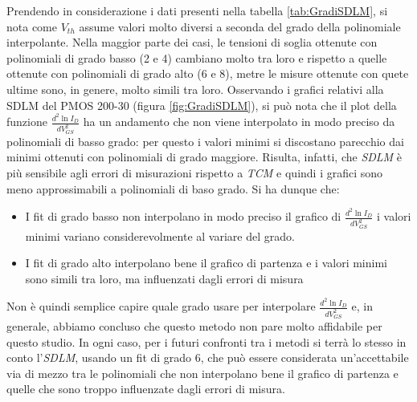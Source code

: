 \documentclass[12pt, letterpaper]{book}
\begin{document}
Prendendo in considerazione i dati presenti nella tabella \ref{tab:GradiSDLM}, si nota come $V_{th}$ assume valori molto diversi a seconda del grado della polinomiale interpolante. Nella maggior parte dei casi, le tensioni di soglia ottenute con polinomiali di grado basso (2 e 4) cambiano molto tra loro e rispetto a quelle ottenute con polinomiali di grado alto (6 e 8), metre le misure ottenute con quete ultime sono, in genere, molto simili tra loro. Osservando i grafici relativi alla SDLM del PMOS 200-30 (figura \ref{fig:GradiSDLM}), si può nota che il plot della funzione $\frac{d^2 \ln I_D}{dV_{GS}^2}$ ha un andamento che non viene interpolato in modo preciso da polinomiali di basso grado: per questo i valori minimi si discostano parecchio dai minimi ottenuti con polinomiali di grado maggiore. Risulta, infatti, che \emph{SDLM} è più sensibile agli errori di misurazioni rispetto a \emph{TCM} e quindi i grafici sono meno approssimabili a polinomiali di baso grado. Si ha dunque che:
\begin{itemize}
  \item I fit di grado basso non interpolano in modo preciso il grafico di $\frac{d^2 \ln I_D}{dV_{GS}^2}$ i valori minimi variano considerevolmente al variare del grado.
  \item I fit di grado alto interpolano bene il grafico di partenza e i valori minimi sono simili tra loro, ma influenzati dagli errori di misura
\end{itemize}

Non è quindi semplice capire quale grado usare per interpolare $\frac{d^2\ln I_D}{dV_{GS}^2}$ e, in generale, abbiamo concluso che questo metodo non pare molto affidabile per questo studio. In ogni caso, per i futuri confronti tra i metodi si terrà lo stesso in conto l'\emph{SDLM}, usando un fit di grado 6, che può essere considerata un'accettabile via di mezzo tra le polinomiali che non interpolano bene il grafico di partenza e quelle che sono troppo influenzate dagli errori di misura.
\end{document}
